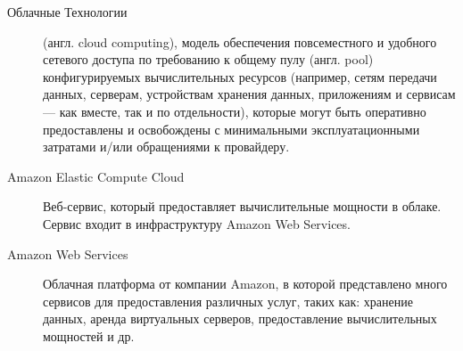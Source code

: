 \Defines %
\begin{description}
  \item[Облачные Технологии] (англ. cloud computing), модель обеспечения повсеместного и удобного сетевого доступа по требованию к общему пулу (англ. pool) конфигурируемых вычислительных ресурсов (например, сетям передачи данных, серверам, устройствам хранения данных, приложениям и сервисам — как вместе, так и по отдельности), которые могут быть оперативно предоставлены и освобождены с минимальными эксплуатационными затратами и/или обращениями к провайдеру.
  \item[Amazon Elastic Compute Cloud] Веб-сервис, который предоставляет вычислительные мощности в облаке. Сервис входит в инфраструктуру Amazon Web Services.
  \item[Amazon Web Services] Облачная платформа от компании Amazon, в которой представлено много сервисов для предоставления различных услуг, таких как: хранение данных, аренда виртуальных серверов, предоставление вычислительных мощностей и др.
\end{description}